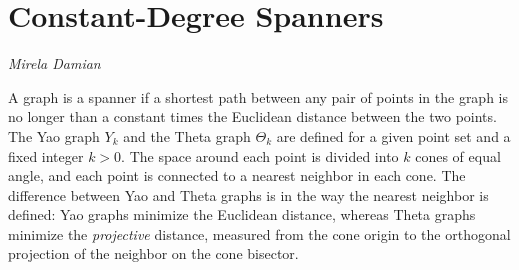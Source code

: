 \documentclass{patmorin}
\begin{document}
%
%
%
%
%
%

\section{Constant-Degree Spanners}

\noindent\emph{Mirela Damian}

A graph is a spanner if a shortest path between any pair of points in the
graph is no longer than a constant times the Euclidean distance between
the two points.  The Yao graph $Y_k$ and the Theta graph $\Theta_k$
are defined for a given point set and a fixed integer $k > 0$. The space
around each point is divided into $k$ cones of equal angle, and each point
is connected to a nearest neighbor in each cone. The difference between
Yao and Theta graphs is in the way the nearest neighbor is defined: Yao
graphs minimize the Euclidean distance, whereas Theta graphs minimize
the \emph{projective} distance, measured from the cone origin to the
orthogonal projection of the neighbor on the cone bisector.
\end{document}
